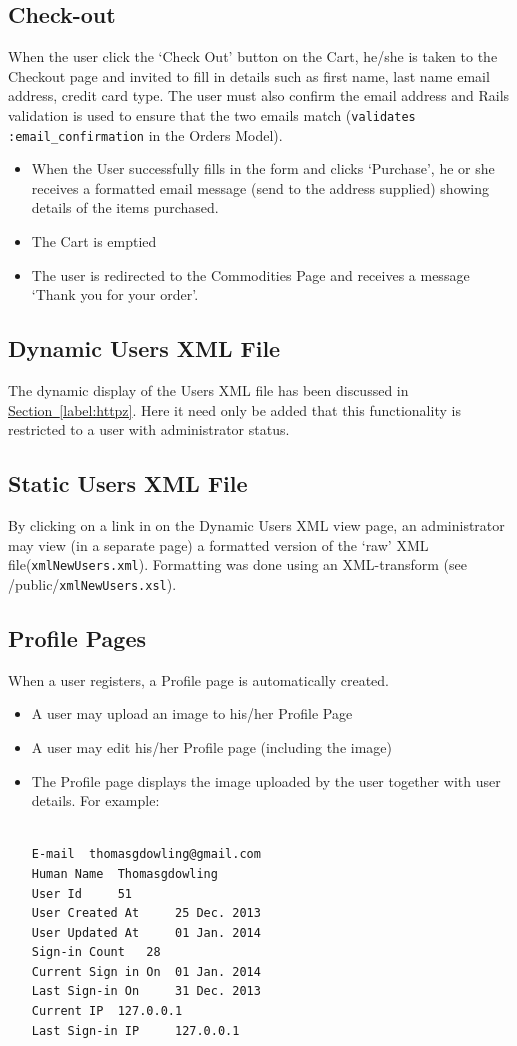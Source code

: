 \documentclass[11pt]{article}
\begin{document}
\subsection{Check-out}
When the user click the `Check Out' button on the Cart, he/she is taken to
the Checkout page and invited to fill in details such as first name, last name
email address, credit card type. The user must also confirm the email address and
Rails validation is used to ensure that the two emails match (\verb|validates| \verb|:email_confirmation| in
the Orders Model).
\begin{itemize}
\item[] When the User successfully fills in the form and clicks `Purchase', he or she receives
a formatted email message (send to the address supplied) showing details of the  items purchased.
\item[] The Cart is emptied
\item[] The user is redirected to the Commodities Page and receives a message `Thank you for your order'.
\end{itemize}
\subsection{Dynamic Users XML File}
The dynamic display of the Users XML file has been discussed in
 \hyperlink{label:secthttpz}{Section~\ref{label:httpz}}. Here it need only be added that this functionality is restricted
to a user with administrator status. 
\subsection{Static Users XML File}
By clicking on a link in on the Dynamic Users XML view page, an administrator may
view (in a separate page) a formatted version of the `raw' XML file(\verb|xmlNewUsers.xml|).  Formatting was
done using an XML-transform (see /public/\verb|xmlNewUsers.xsl|). 
\subsection{Profile Pages}
When a user registers, a Profile page is automatically created.
\begin{itemize}
\item[] A user may upload an image to his/her Profile Page
\item[] A user may edit his/her Profile page (including the image)
\item[] The Profile page displays the image uploaded by the user together
with user details. For example:
\begin{verbatim}

E-mail 	thomasgdowling@gmail.com
Human Name 	Thomasgdowling
User Id 	51
User Created At 	25 Dec. 2013
User Updated At 	01 Jan. 2014
Sign-in Count 	28
Current Sign in On 	01 Jan. 2014
Last Sign-in On 	31 Dec. 2013
Current IP 	127.0.0.1
Last Sign-in IP 	127.0.0.1

\end{verbatim}
\end{itemize}
\end{document}

